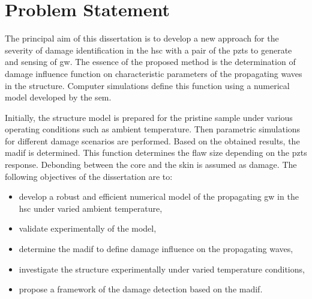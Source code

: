 

\chapter[Problem Statement]{Problem Statement}
\label{ch:problem}



The principal aim of this dissertation is to develop a new approach for the severity of damage identification in the \ac{hsc} with a pair of the \acp{pzt} to generate and sensing of \ac{gw}. 
The essence of the proposed method is the determination of damage influence function on characteristic parameters of the propagating waves in the structure.
Computer simulations define this function using a numerical model developed by the \ac{sem}.

Initially, the structure model is prepared for the pristine sample under various operating conditions such as ambient temperature.
Then parametric simulations for different damage scenarios are performed.
Based on the obtained results, the \ac{madif} is determined.
This function determines the flaw size depending on the \acp{pzt} response.
Debonding between the core and the skin is assumed as damage.
The following objectives of the dissertation are to: 
\begin{itemize}
	\item develop a robust and efficient numerical model of the propagating \ac{gw} in the \ac{hsc} under varied ambient temperature,
	\item validate experimentally of the model,
	\item determine the \ac{madif} to define damage influence on the propagating waves,
	\item investigate the structure
experimentally under varied temperature conditions,
	\item propose a framework of the damage detection based on the \ac{madif}.
\end{itemize}